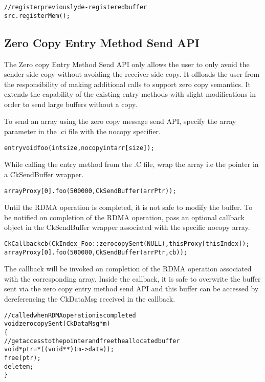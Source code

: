 \begin{alltt}
// register previously de-registered buffer
src.registerMem();
\end{alltt}

\subsection{Zero Copy Entry Method Send API}
The Zero copy Entry Method Send API only allows the user to only avoid the sender
side copy without avoiding the receiver side copy. It offloads the user from the
responsibility of making additional calls to support zero copy semantics.
It extends the capability of the existing entry methods with slight modifications
in order to send large buffers without a copy.

\vspace{0.1in}
\noindent
To send an array using the zero copy message send API, specify the array parameter
in the .ci file with the nocopy specifier.

\begin{alltt}
entry void foo (int size, nocopy int arr[size]);
\end{alltt}

While calling the entry method from the .C file, wrap the array i.e the
pointer in a CkSendBuffer wrapper.

\begin{alltt}
arrayProxy[0].foo(500000, CkSendBuffer(arrPtr));
\end{alltt}

Until the RDMA operation is completed, it is not safe to modify the buffer.
To be notified on completion of the RDMA operation, pass an optional callback object
in the CkSendBuffer wrapper associated with the specific nocopy array.

\begin{alltt}
CkCallback cb(CkIndex_Foo::zerocopySent(NULL), thisProxy[thisIndex]);
arrayProxy[0].foo(500000, CkSendBuffer(arrPtr, cb));
\end{alltt}

The callback will be invoked on completion of the RDMA operation associated with the
corresponding array. Inside the callback, it is safe to overwrite the buffer sent
via the zero copy entry method send API and this buffer can be accessed by dereferencing
the CkDataMsg received in the callback.

\begin{alltt}
//called when RDMA operation is completed
void zerocopySent(CkDataMsg *m)
\{
  //get access to the pointer and free the allocated buffer
  void *ptr = *((void **)(m->data));
  free(ptr);
  delete m;
\}
\end{alltt}

